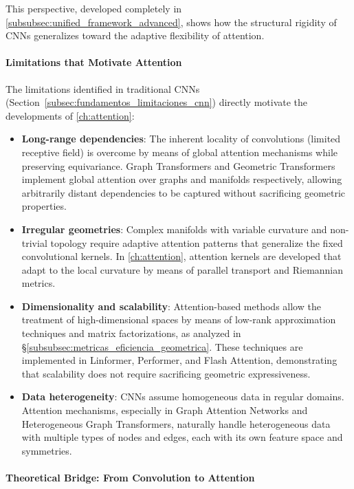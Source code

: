 This perspective, developed completely in \autoref{subsubsec:unified_framework_advanced}, shows how the structural rigidity of CNNs generalizes toward the adaptive flexibility of attention.

\paragraph{Limitations that Motivate Attention}

The limitations identified in traditional CNNs (Section~\ref{subsec:fundamentos_limitaciones_cnn}) directly motivate the developments of \autoref{ch:attention}:

\begin{itemize}
\item \textbf{Long-range dependencies}: The inherent locality of convolutions (limited receptive field) is overcome by means of global attention mechanisms while preserving equivariance. Graph Transformers and Geometric Transformers implement global attention over graphs and manifolds respectively, allowing arbitrarily distant dependencies to be captured without sacrificing geometric properties.

\item \textbf{Irregular geometries}: Complex manifolds with variable curvature and non-trivial topology require adaptive attention patterns that generalize the fixed convolutional kernels. In \autoref{ch:attention}, attention kernels are developed that adapt to the local curvature by means of parallel transport and Riemannian metrics.

\item \textbf{Dimensionality and scalability}: Attention-based methods allow the treatment of high-dimensional spaces by means of low-rank approximation techniques and matrix factorizations, as analyzed in §\ref{subsubsec:metricas_eficiencia_geometrica}. These techniques are implemented in Linformer, Performer, and Flash Attention, demonstrating that scalability does not require sacrificing geometric expressiveness.

\item \textbf{Data heterogeneity}: CNNs assume homogeneous data in regular domains. Attention mechanisms, especially in Graph Attention Networks and Heterogeneous Graph Transformers, naturally handle heterogeneous data with multiple types of nodes and edges, each with its own feature space and symmetries.
\end{itemize}

\paragraph{Theoretical Bridge: From Convolution to Attention}

